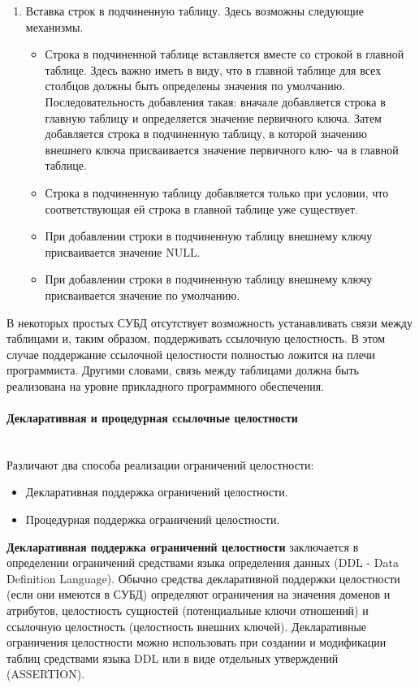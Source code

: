 \begin{enumerate}
    \item Вставка строк в подчиненную таблицу. Здесь возможны следующие механизмы.
        \begin{itemize}
            \item Строка в подчиненной таблице вставляется вместе со строкой в главной таблице. Здесь важно иметь в виду, что в главной таблице для всех столбцов должны быть определены значения по умолчанию. Последовательность добавления такая: вначале добавляется строка в главную таблицу и определяется значение первичного ключа. Затем добавляется строка в подчиненную таблицу, в которой значению внешнего ключа присваивается значение первичного клю- ча в главной таблице.
            \item Строка в подчиненную таблицу добавляется только при условии, что соответствующая ей строка в главной таблице уже существует.
            \item При добавлении строки в подчиненную таблицу внешнему ключу присваивается значение NULL.
            \item При добавлении строки в подчиненную таблицу внешнему ключу присваивается значение по умолчанию.
        \end{itemize}
\end{enumerate}

В некоторых простых СУБД отсутствует возможность устанавливать связи между таблицами и, таким образом, поддерживать ссылочную целостность. В этом случае поддержание ссылочной целостности полностью ложится на плечи программиста. Другими словами, связь между таблицами должна быть реализована на уровне прикладного программного обеспечения.

\paragraph{Декларативная и процедурная ссылочные целостности} ~\\

Различают два способа реализации ограничений целостности:

\begin{itemize}
    \item Декларативная поддержка ограничений целостности.
    \item Процедурная поддержка ограничений целостности.
\end{itemize}

\begin{grayquote}
    \textbf{Декларативная поддержка ограничений целостности} заключается в определении ограничений средствами языка определения данных (DDL - Data Definition Language). Обычно средства декларативной поддержки целостности (если они имеются в СУБД) определяют ограничения на значения доменов и атрибутов, целостность сущностей (потенциальные ключи отношений) и ссылочную целостность (целостность внешних ключей). Декларативные ограничения целостности можно использовать при создании и модификации таблиц средствами языка DDL или в виде отдельных утверждений (ASSERTION).
\end{grayquote}

